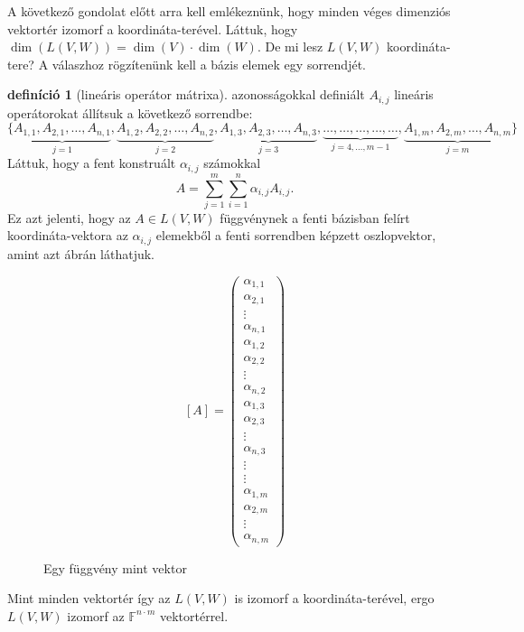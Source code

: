 \documentclass[a4paper, showtrims]{memoir}
\theoremstyle{plain}
\theoremstyle{remark}
\theoremstyle{definition}
\newtheorem{definition}[proposition]{definíció}
\begin{document}
A következő gondolat előtt arra kell emlékeznünk,
hogy minden véges dimenziós vektortér izomorf a koordináta-terével.
Láttuk, hogy $\dim \left( L\left( V,W \right) \right)=\dim(V)\cdot\dim(W)$.
De mi lesz $L\left( V,W \right)$ koordináta-tere?
A válaszhoz rögzítenünk kell a bázis elemek egy sorrendjét.
\begin{definition}[lineáris operátor mátrixa]
     azonosságokkal definiált $A_{i,j}$ lineáris operátorokat állítsuk a következő sorrendbe:
	\[
		\{
		\underbrace{A_{1,1},A_{2,1},\ldots,A_{n,1}}_{j=1},
		\underbrace{A_{1,2},A_{2,2},\ldots,A_{n,2}}_{j=2},
		\underbrace{A_{1,3},A_{2,3},\ldots,A_{n,3}}_{j=3},
		\underbrace{\dots,\ldots,\dots,\ldots,\dots}_{j=4,\ldots,m-1},
		\underbrace{A_{1,m},A_{2,m},\ldots,A_{n,m}}_{j=m}
		\}
	\]
	Láttuk, hogy a fent konstruált $\alpha_{i,j}$ számokkal
	\[
		A=
		\sum_{j=1}^m\sum_{i=1}^n\alpha_{i,j}A_{i,j}.
	\]
	Ez azt jelenti, hogy az $A\in L\left( V,W \right)$ függvénynek a fenti bázisban felírt koordináta-vektora
	az $\alpha_{i,j}$ elemekből a fenti sorrendben képzett oszlopvektor, 
    amint azt  ábrán láthatjuk.
    \begin{figure}
        \label{fig:elomatrix}
	\[
		\left[ A \right]=
		\begin{pmatrix}
			\alpha_{1,1} \\ \alpha_{2,1}\\ \vdots \\ \alpha_{n,1}\\
			\alpha_{1,2} \\ \alpha_{2,2}\\ \vdots \\ \alpha_{n,2}\\
			\alpha_{1,3} \\ \alpha_{2,3}\\ \vdots \\ \alpha_{n,3}\\
			\vdots       \\ \vdots\\
			\alpha_{1,m} \\ \alpha_{2,m}\\ \vdots \\ \alpha_{n,m}
		\end{pmatrix}\tag{\dag}
	\]
    \caption{Egy függvény mint vektor}
    \end{figure}
	Mint minden vektortér így az $L\left( V,W \right)$ is izomorf a koordináta-terével, ergo $L\left( V,W \right)$ izomorf
	az $\mathbb{F}^{n\cdot m}$ vektortérrel.


\end{definition}
\end{document}
